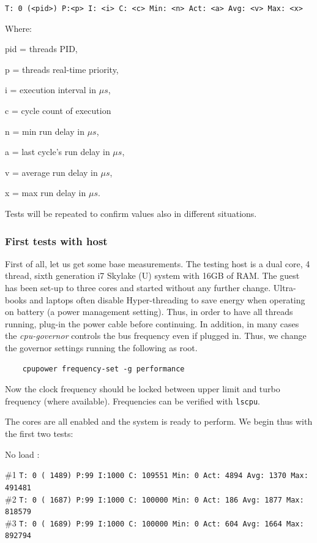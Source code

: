 \documentclass[]{scrartcl}
\begin{document}
\noindent \small \texttt{T: 0 (<pid>) P:<p> I: <i> C: <c> Min: <n> Act: <a> Avg: <v> Max: <x>}
\bigskip

Where:
\begin{where}
	\item[pid =] threads PID,
	\item[p =] threads real-time priority,
	\item[i =] execution interval in $\mu s$,
	\item[c =] cycle count of execution
	\item[n =] min run delay in $\mu s$,
	\item[a =] last cycle's run delay in $\mu s$,
	\item[v =] average run delay in $\mu s$,
	\item[x =] max run delay in $\mu s$.
\end{where} 

Tests will be repeated to confirm values also in different situations.

\subsubsection{First tests with host}

First of all, let us get some base measurements. The testing host is a dual core, 4 thread, sixth generation i7 Skylake (U) system with 16GB of RAM. The guest has been set-up to three cores
and started without any further change. 
Ultra-books and laptops often disable Hyper-threading to save energy when operating on battery (a power management setting). Thus, in order to have all threads running, plug-in the power cable before continuing.
In addition, in many cases the \textit{cpu-governor} controls the bus frequency even if plugged in. Thus, we change the governor settings running the following as root. 

\begin{verbatim}
	cpupower frequency-set -g performance
\end{verbatim}

Now the clock frequency should be locked between upper limit and turbo frequency (where available). Frequencies can be verified with \texttt{lscpu}. 

The cores are all enabled and the system is ready to perform.
We begin thus with the first two tests:

\bigskip

\noindent No load :

\noindent \small \#1 \texttt{T: 0 ( 1489) P:99 I:1000 C: 109551 Min: 0 Act: 4894 Avg: 1370 Max:  491481}\\
\noindent \small \#2 \texttt{T: 0 ( 1687) P:99 I:1000 C: 100000 Min: 0 Act:  186 Avg: 1877 Max:  818579}\\
\noindent \small \#3 \texttt{T: 0 ( 1689) P:99 I:1000 C: 100000 Min: 0 Act:  604 Avg: 1664 Max:  892794}\\
\end{document}
